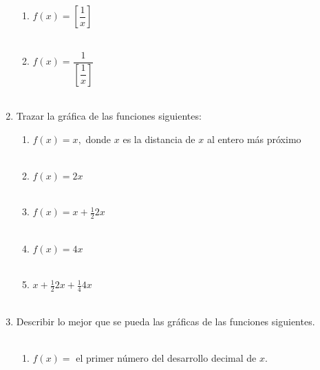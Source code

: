 \begin{enumerate}[\bfseries 1.]
\begin{enumerate}[\bfseries (i)]
	\item $f(x)=\left[\dfrac{1}{x}\right]$\\\\

	\item $f(x)=\dfrac{1}{\left[\dfrac{1}{x}\right]}$\\\\

    \end{enumerate}

    \item Trazar la gráfica de las funciones siguientes:
    \begin{enumerate}[\bfseries (a)]
	
	\item $f(x)={x},$ donde ${x}$ es la distancia de $x$ al entero más próximo\\\\
	
	\item $f(x)={2x}$\\\\
	
	\item $f(x)={x}+\frac{1}{2}{2x}$\\\\
	
	\item $f(x)={4x}$\\\\
	
	\item ${x} + \frac{1}{2}{2x} + \frac{1}{4}{4x}$\\\\

    \end{enumerate}

    \item Describir lo mejor que se pueda las gráficas de las funciones siguientes.\\\\
    \begin{enumerate}[\bfseries (i)]
	
	\item $f(x)=$ el primer número del desarrollo decimal de $x$.\\\\


\end{enumerate}
\end{enumerate}
